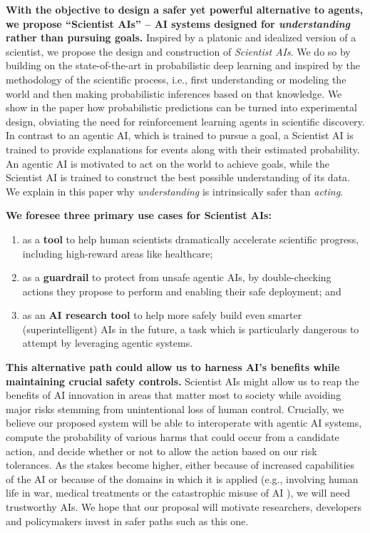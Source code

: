 \textbf{With the objective to design a safer yet powerful alternative to agents, we propose ``Scientist AIs'' – AI systems designed for \emph{understanding} rather than pursuing goals.} Inspired by a platonic and idealized version of a scientist, we propose the design and construction of \emph{Scientist AIs}. We do so by building on the state-of-the-art in probabilistic deep learning and inspired by the methodology of the scientific process, i.e., first understanding or modeling the world and then making probabilistic inferences based on that knowledge. We show in the paper how probabilistic predictions can be turned into experimental design, obviating the need for reinforcement learning agents in scientific discovery. In contrast to an agentic AI, which is trained to pursue a goal, a Scientist AI is trained to provide explanations for events along with their estimated probability. An agentic AI is motivated to act on the world to achieve goals, while the Scientist AI is trained to construct the best possible understanding of its data. We explain in this paper why \emph{understanding} is intrinsically safer than \emph{acting}.

\textbf{We foresee three primary use cases for Scientist AIs:}
\begin{enumerate}
    \item as a \textbf{tool} to help human scientists dramatically accelerate scientific progress, including high-reward areas like healthcare;  
    \item as a \textbf{guardrail} to protect from unsafe agentic AIs, by double-checking actions they propose to perform and enabling their safe deployment; and  
    \item as an \textbf{AI research tool} to help more safely build even smarter (superintelligent) AIs in the future, a task which is particularly dangerous to attempt by leveraging agentic systems.
\end{enumerate}

\textbf{This alternative path could allow us to harness AI's benefits while maintaining crucial safety controls.} Scientist AIs might allow us to reap the benefits of AI innovation in areas that matter most to society \cite{royalsociety.org...media.policy.projects.machine.learning.publications.public.views.of.machine.learning.ipsos.mori.pdf} while avoiding major risks stemming from unintentional loss of human control. Crucially, we believe our proposed system will be able to interoperate with agentic AI systems, compute the probability of various harms that could occur from a candidate action, and decide whether or not to allow the action based on our risk tolerances. As the stakes become higher, either because of increased capabilities of the AI or because of the domains in which it is applied (e.g., involving human life in war, medical treatments or the catastrophic misuse of AI \cite{www.gov.uk.government.publications.international.ai.safety.report.2025}), we will need trustworthy AIs. We hope that our proposal will motivate researchers, developers and policymakers invest in safer paths such as this one.

